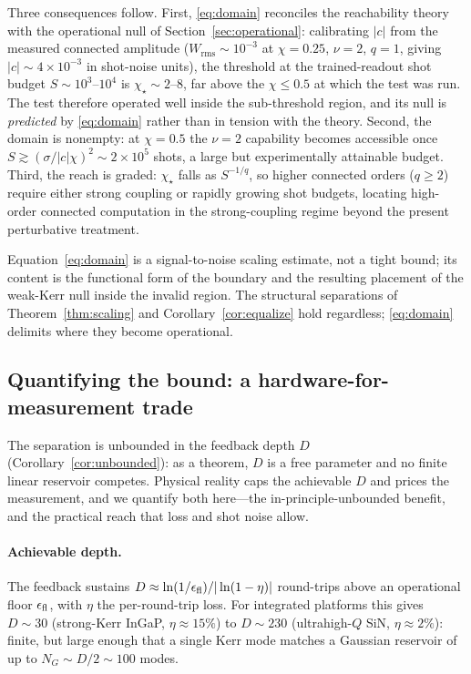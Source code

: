 \documentclass[11pt]{article}
\theoremstyle{remark}
\begin{document}
Three consequences follow. First, \eqref{eq:domain} reconciles the reachability
theory with the operational null of Section~\ref{sec:operational}: calibrating
$|c|$ from the measured connected amplitude ($W_{\mathrm{rms}}\sim10^{-3}$ at
$\chi=0.25$, $\nu=2$, $q=1$, giving $|c|\sim4\times10^{-3}$ in shot-noise units),
the threshold at the trained-readout shot budget $S\sim10^{3}$--$10^{4}$ is
$\chi_\star\sim2$--$8$, far above the $\chi\le0.5$ at which the test was run. The
test therefore operated well inside the sub-threshold region, and its null is
\emph{predicted} by \eqref{eq:domain} rather than in tension with the theory.
Second, the domain is nonempty: at $\chi=0.5$ the $\nu=2$ capability becomes
accessible once $S\gtrsim(\sigma/|c|\chi)^{2}\sim2\times10^{5}$ shots, a large but
experimentally attainable budget. Third, the reach is graded: $\chi_\star$ falls
as $S^{-1/q}$, so higher connected orders ($q\ge2$) require either strong coupling
or rapidly growing shot budgets, locating high-order connected computation in the
strong-coupling regime beyond the present perturbative treatment.

Equation~\eqref{eq:domain} is a signal-to-noise scaling estimate, not a tight
bound; its content is the functional form of the boundary and the resulting
placement of the weak-Kerr null inside the invalid region. The structural
separations of Theorem~\ref{thm:scaling} and Corollary~\ref{cor:equalize} hold
regardless; \eqref{eq:domain} delimits where they become operational.

\subsection{Quantifying the bound: a hardware-for-measurement trade}
\label{sec:ledger}

The separation is unbounded in the feedback depth $D$ (Corollary~\ref{cor:unbounded}):
as a theorem, $D$ is a free parameter and no finite linear reservoir competes.
Physical reality caps the achievable $D$ and prices the measurement, and we
quantify both here---the in-principle-unbounded benefit, and the practical reach
that loss and shot noise allow.

\paragraph{Achievable depth.}
The feedback sustains $D\approx\ln(1/\epsilon_{\rm fl})/|\ln(1-\eta)|$ round-trips
above an operational floor $\epsilon_{\rm fl}$, with $\eta$ the per-round-trip loss.
For integrated platforms this gives $D\sim30$ (strong-Kerr InGaP, $\eta\approx15\%$)
to $D\sim230$ (ultrahigh-$Q$ SiN, $\eta\approx2\%$): finite, but large enough that
a single Kerr mode matches a Gaussian reservoir of up to $N_G\sim D/2\sim100$ modes.
\end{document}
